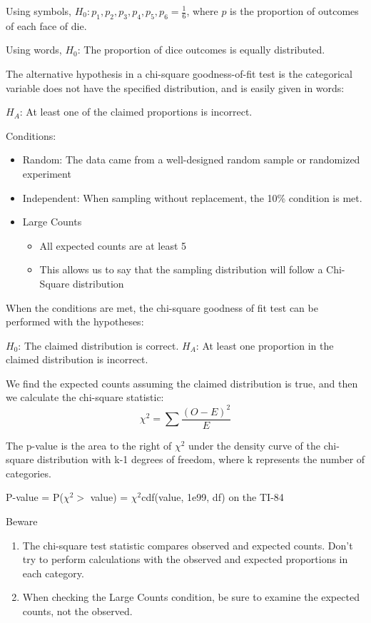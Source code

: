\documentclass[../stats.tex]{subfiles}
\begin{document}
Using symbols, $H_0: p_1,p_2,p_3,p_4,p_5,p_6 = \frac{1}{6}$, where $p$ is the proportion of outcomes of each face of die.

Using words, $H_0$: The proportion of dice outcomes is equally distributed.

The alternative hypothesis in a chi-square goodness-of-fit test is the categorical variable does not have the specified distribution, and is easily given in words: 

$H_A$: At least one of the claimed proportions is incorrect.

Conditions:
\begin{itemize}
    \item Random: The data came from a well-designed random sample or randomized experiment 
    \item Independent: When sampling without replacement, the 10\% condition is met.
    \item Large Counts
    \begin{itemize}
        \item All expected counts are at least 5
        \item This allows us to say that the sampling distribution will follow a Chi-Square distribution 
    \end{itemize}
\end{itemize}

When the conditions are met, the chi-square goodness of fit test can be performed with the hypotheses:
\begin{center}
    $H_0$: The claimed distribution is correct.
    $H_A$: At least one proportion in the claimed distribution is incorrect.
\end{center}

We find the expected counts assuming the claimed distribution is true, and then we calculate the chi-square statistic:
\[ \chi^2 = \sum \frac{(O-E)^2}{E} \]

The p-value is the area to the right of $\chi^2$ under the density curve of the chi-square distribution with k-1 degrees of freedom, where k represents the number of categories.
\begin{center}
    P-value = P($\chi^2>$ value) = $\chi^2$cdf(value, 1e99, df) on the TI-84
\end{center}

Beware
\begin{enumerate}
    \item The chi-square test statistic compares observed and expected counts. Don't try to perform calculations with the observed and expected proportions in each category.
    \item When checking the Large Counts condition, be sure to examine the expected counts, not the observed.
\end{enumerate}
\end{document}
